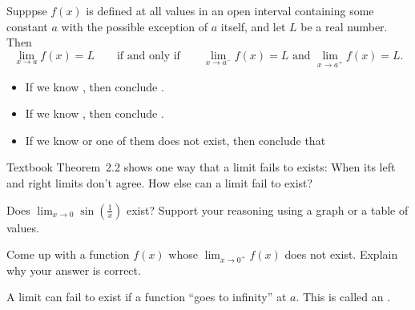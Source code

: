 \documentclass[../main.tex]{subfiles}
\begin{document}
  \begin{mdframed}[style=withref-compact]
    Supppse \(f(x)\) is defined at all values in an open interval containing some constant \(a\) with the possible exception of \(a\) itself, and let \(L\) be a real number. Then
    \[
      \lim_{x \to a} f(x) = L \qquad\text{if and only if}\qquad \lim_{x \to a^{-}} f(x) = L \text{ and } \lim_{x \to a^{+}} f(x) = L.
    \]
  \end{mdframed}
  
  \begin{itemize}[topsep={1ex}]
    \item If we know \underline{\hspace{2in}}, then conclude \underline{\hspace{3in}}.
      \vfill{}

    \item If we know \underline{\hspace{2in}}, then conclude \underline{\hspace{3in}}.
      \vfill{}
    \item If we know \underline{\hspace{2in}} or one of them does not exist, then conclude that 
      \vfill{}
  \end{itemize}
  \clearpage
  

  Textbook Theorem~2.2 shows one way that a limit fails to exists: When its left and right limits don't agree. How else can a limit fail to exist?

  \begin{example} \label{ex:limit-sin-1/x}
    Does \(\lim_{x \to 0} \sin \left(\frac{1}{x}\right) \) exist? Support your reasoning using a graph or a table of values.

  \end{example}

  \begin{example}
    Come up with a function \(f(x)\) whose \( \lim_{x \to 0^{+}} f(x)\) does not exist. Explain why your answer is correct. 

  \end{example}

  A limit can fail to exist if a function ``goes to infinity'' at \(a\). This is called an . 
\end{document}
